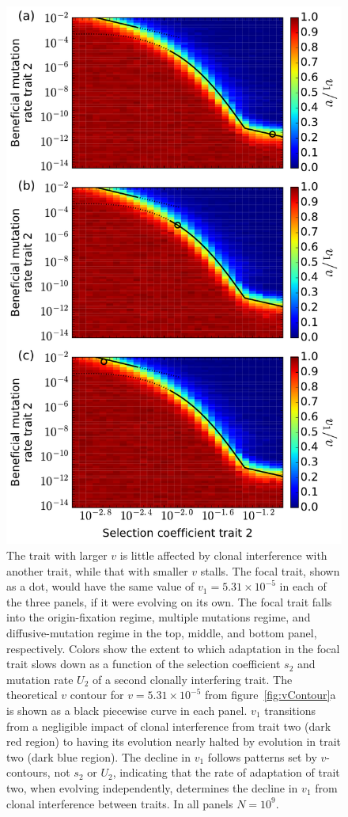 \documentclass[9pt,twocolumn,twoside]{article}
\begin{document}
\begin{figure}[!h]
\centering
\includegraphics[scale=.44]{fig_two_trait_compare_v_fixed_s1_U1.pdf}
\caption{\label{fig:evolutionarystalling} \small The trait with larger $v$ is little affected by clonal interference with another trait, while that with smaller $v$ stalls. The focal trait, shown as a dot, would have the same value of $v_1=5.31\times 10^{-5}$ in each of the three panels, if it were evolving on its own. The focal trait falls into the origin-fixation regime, multiple mutations regime, and diffusive-mutation regime in the top, middle, and bottom panel, respectively. Colors show the extent to which adaptation in the focal trait slows down as a function of the selection coefficient $s_2$ and mutation rate $U_2$ of a second clonally interfering trait. The theoretical $v$ contour for $v=5.31\times 10^{-5}$ from figure~\ref{fig:vContour}a is shown as a black piecewise curve in each panel. $v_1$ transitions from a negligible impact of clonal interference from trait two (dark red region) to having its evolution nearly halted by evolution in trait two (dark blue region). The decline in $v_1$ follows patterns set by $v$-contours, not $s_2$ or $U_2$, indicating that the rate of adaptation of trait two, when evolving independently, determines the decline in $v_1$ from clonal interference between traits. In all panels $N=10^9$.}
\end{figure}
\end{document}
